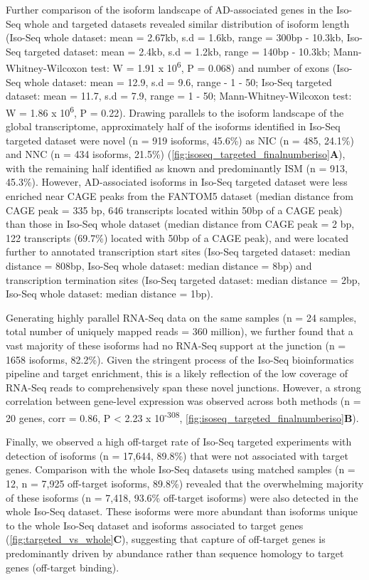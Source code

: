 Further comparison of the isoform landscape of AD-associated genes in the Iso-Seq whole and targeted datasets revealed similar distribution of isoform length (Iso-Seq whole dataset: mean = 2.67kb, s.d = 1.6kb, range = 300bp - 10.3kb, Iso-Seq targeted dataset: mean = 2.4kb, s.d = 1.2kb, range = 140bp - 10.3kb; Mann-Whitney-Wilcoxon test: W = 1.91 x 10\textsuperscript{6}, P = 0.068) and number of exons (Iso-Seq whole dataset: mean = 12.9, s.d = 9.6, range - 1 - 50; Iso-Seq targeted dataset: mean = 11.7, s.d = 7.9, range = 1 - 50; Mann-Whitney-Wilcoxon test: W = 1.86 x 10\textsuperscript{6}, P = 0.22). Drawing parallels to the isoform landscape of the global transcriptome, approximately half of the isoforms identified in Iso-Seq targeted dataset were novel (n = 919 isoforms, 45.6\%) as NIC (n = 485, 24.1\%) and NNC (n = 434 isoforms, 21.5\%) (\cref{fig:isoseq_targeted_finalnumberiso}\textbf{A}), with the remaining half identified as known and predominantly ISM (n = 913, 45.3\%). However, AD-associated isoforms in Iso-Seq targeted dataset were less enriched near CAGE peaks from the FANTOM5 dataset (median distance from CAGE peak = 335 bp, 646 transcripts located within 50bp of a CAGE peak) than those in Iso-Seq whole dataset (median distance from CAGE peak = 2 bp, 122 transcripts (69.7\%) located with 50bp of a CAGE peak), and were located further to annotated transcription start sites (Iso-Seq targeted dataset: median distance = 808bp, Iso-Seq whole dataset: median distance = 8bp) and transcription termination sites (Iso-Seq targeted dataset: median distance = 2bp, Iso-Seq whole dataset: median distance = 1bp). 

Generating highly parallel RNA-Seq data on the same samples (n = 24 samples, total number of uniquely mapped reads = 360 million), we further found that a vast majority of these isoforms had no RNA-Seq support at the junction (n = 1658 isoforms, 82.2\%). Given the stringent process of the Iso-Seq bioinformatics pipeline and target enrichment, this is a likely reflection of the low coverage of RNA-Seq reads to comprehensively span these novel junctions. However, a strong correlation between gene-level expression was observed across both methods (n = 20 genes, corr = 0.86, P < 2.23 x 10\textsuperscript{-308}, \cref{fig:isoseq_targeted_finalnumberiso}\textbf{B}). 

Finally, we observed a high off-target rate of Iso-Seq targeted experiments with detection of isoforms (n = 17,644, 89.8\%) that were not associated with target genes. Comparison with the whole Iso-Seq datasets using matched samples (n = 12, n = 7,925 off-target isoforms, 89.8\%) revealed that the overwhelming majority of these isoforms (n = 7,418, 93.6\% off-target isoforms) were also detected in the whole Iso-Seq dataset. These isoforms were more abundant than isoforms unique to the whole Iso-Seq dataset and isoforms associated to target genes (\cref{fig:targeted_vs_whole}\textbf{C}), suggesting that capture of off-target genes is predominantly driven by abundance rather than sequence homology to target genes (off-target binding).  

